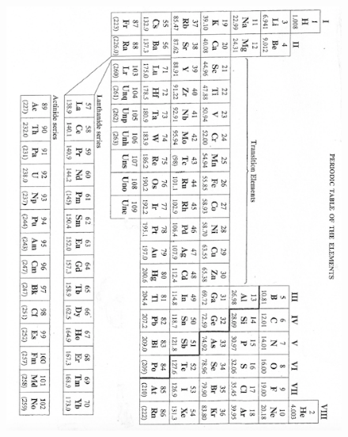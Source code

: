 \documentclass[11pt]{memoir}
\begin{document}
\begin{itemize}
\begin{figure}[h]
\vspace{10pt}
\begin{center}
\includegraphics[width=1.0\textwidth]{images/lewis_periodictable.png}
\end{center}
\end{figure}

\end{itemize}
\end{document}
